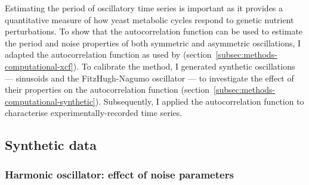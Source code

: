 Estimating the period of oscillatory time series is important as it provides a quantitative measure of how yeast metabolic cycles respond to genetic nutrient perturbations.
To show that the autocorrelation function can be used to estimate the period and noise properties of both symmetric and asymmetric oscillations, I adapted the autocorrelation function as used by \textcite{pietschDeterminingGrowthRates2023} (section~\ref{subsec:methods-computational-xcf}).
To calibrate the method, I generated synthetic oscillations --- sinusoids and the FitzHugh-Nagumo oscillator \parencite{fitzhughImpulsesPhysiologicalStates1961} --- to investigate the effect of their properties on the autocorrelation function (section~\ref{subsec:methods-computational-synthetic}).
Subsequently, I applied the autocorrelation function to characterise experimentally-recorded time series.

\subsection{Synthetic data}
\label{subsubsec:analysis-characterisation-synthetic}

\subsubsection{Harmonic oscillator: effect of noise parameters}
\label{subsubsec:analysis-characterisation-acf-sinusoid}

